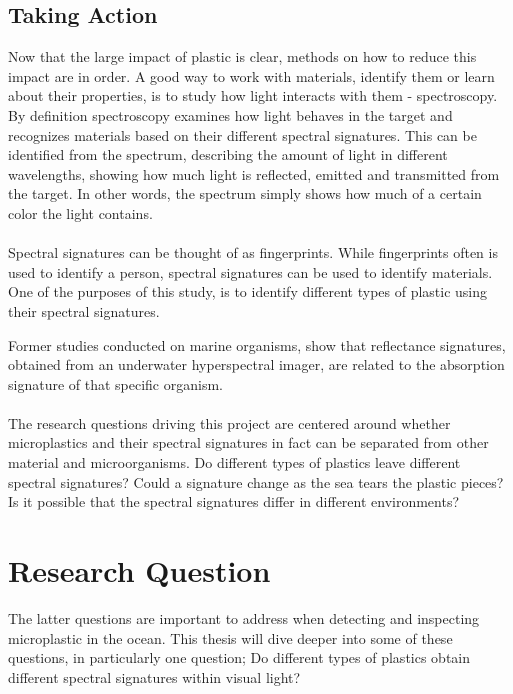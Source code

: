 \subsection{Taking Action}
Now that the large impact of plastic is clear, methods on how to reduce this impact are in order. A good way to work with materials, identify them or learn about their properties, is to study how light interacts with them - spectroscopy. By definition spectroscopy examines how light behaves in the target and recognizes materials based on their different spectral signatures. This can be identified from the spectrum, describing the amount of light in different wavelengths, showing how much light is reflected, emitted and transmitted from the target. In other words, the spectrum simply shows how much of a certain color the light contains. 
\\\\
Spectral signatures can be thought of as fingerprints. While fingerprints often is used to identify a person, spectral signatures can be used to identify materials. One of the purposes of this study, is to identify different types of plastic using their spectral signatures. %

Former studies conducted on marine organisms, show that reflectance signatures, obtained from an underwater hyperspectral imager, are related to the absorption signature of that specific organism. %
\\\\
The research questions driving this project are centered around whether microplastics and their spectral signatures in fact can be separated from other material and microorganisms. Do different types of plastics leave different spectral signatures? Could a signature change as the sea tears the plastic pieces? Is it possible that the spectral signatures differ in different environments?

\section{Research Question}
The latter questions are important to address when detecting and inspecting microplastic in the ocean. This thesis will dive deeper into some of these questions, in particularly one question; Do different types of plastics obtain different spectral signatures within visual light?

